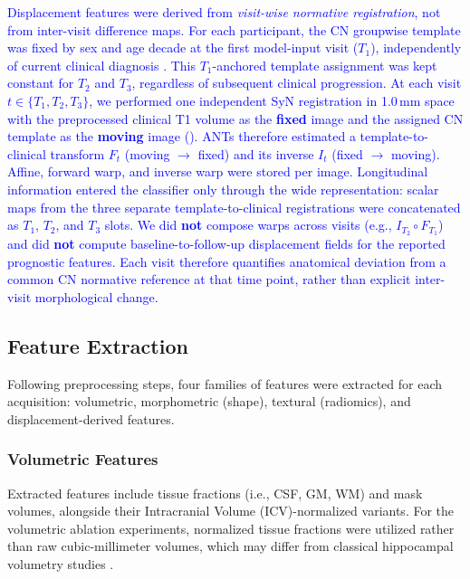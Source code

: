 \documentclass[review]{elsarticle}
\newcommand{\code}[1]{\texttt{\seqsplit{#1}}}
\begin{document}
	\textcolor{blue}{Displacement features were derived from \emph{visit-wise normative registration}, not from inter-visit difference maps. For each participant, the CN groupwise template was fixed by sex and age decade at the first model-input visit ($T_1$), independently of current clinical diagnosis \cite{wyman-2013}. This $T_1$-anchored template assignment was kept constant for $T_2$ and $T_3$, regardless of subsequent clinical progression.
		At each visit $t \in \{T_1,T_2,T_3\}$, we performed one independent SyN registration in 1.0\,mm space with the preprocessed clinical T1 volume as the \textbf{fixed} image and the assigned CN template as the \textbf{moving} image (\code{ants.registration}). ANTs therefore estimated a template-to-clinical transform $F_t$ (moving $\rightarrow$ fixed) and its inverse $I_t$ (fixed $\rightarrow$ moving). Affine, forward warp, and inverse warp were stored per image.
		Longitudinal information entered the classifier only through the wide representation: scalar maps from the three separate template-to-clinical registrations were concatenated as $T_1$, $T_2$, and $T_3$ slots. We did \textbf{not} compose warps across visits (e.g., $I_{T_2}\circ F_{T_1}$) and did \textbf{not} compute baseline-to-follow-up displacement fields for the reported prognostic features. Each visit therefore quantifies anatomical deviation from a common CN normative reference at that time point, rather than explicit inter-visit morphological change.}
	
	\subsection{Feature Extraction}\label{sec:feature-extraction}
	
	Following preprocessing steps, four families of features were extracted for each acquisition: volumetric, morphometric (shape), textural (radiomics), and displacement-derived features. 
	
	\subsubsection{Volumetric Features}
	Extracted features include tissue fractions (i.e., CSF, GM, WM) and mask volumes, alongside their Intracranial Volume (ICV)-normalized variants. For the volumetric ablation experiments, normalized tissue fractions were utilized rather than raw cubic-millimeter volumes, which may differ from classical hippocampal volumetry studies \cite{wyman-2013}.
	
\end{document}
